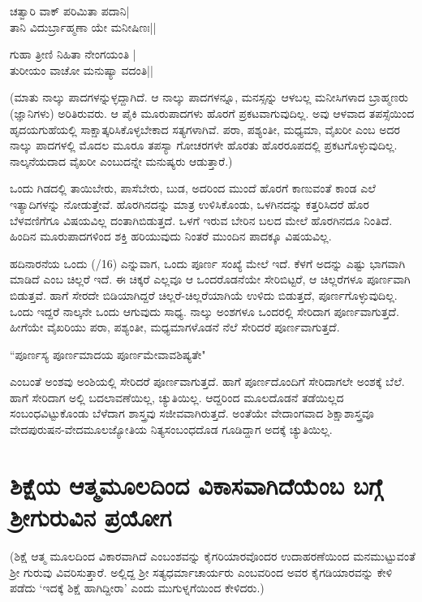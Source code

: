 \begin{shloka}
ಚತ್ವಾರಿ ವಾಕ್ ಪರಿಮಿತಾ ಪದಾನಿ|\label{22}\\
ತಾನಿ ವಿದುರ್ಬ್ರಾಹ್ಮಣಾ ಯೇ ಮನೀಷಿಣಃ||
\end{shloka}

\begin{shloka}
ಗುಹಾ ತ್ರೀಣಿ ನಿಹಿತಾ ನೇಂಗಯಂತಿ |\\
ತುರೀಯಂ ವಾಚೋ ಮನುಷ್ಯಾ ವದಂತಿ||
\end{shloka}

(ಮಾತು ನಾಲ್ಕು ಪಾದಗಳನ್ನುಳ್ಳದ್ದಾಗಿದೆ. ಆ ನಾಲ್ಕು  ಪಾದಗಳನ್ನೂ, ಮನಸ್ಸನ್ನು ಆಳಬಲ್ಲ ಮನೀಸಿಗಳಾದ ಬ್ರಾಹ್ಮಣರು (ಜ್ಞಾನಿಗಳು) ಅರಿತಿರುವರು. ಆ ಪೈಕಿ ಮೂರುಪಾದಗಳು ಹೊರಗೆ ಪ್ರಕಟವಾಗುವುದಿಲ್ಲ. ಅವು ಆಳವಾದ ತಪಸ್ಸೆಯಿಂದ ಹೃದಯಗುಹೆಯಲ್ಲಿ ಸಾಕ್ಷಾತ್ಕರಿಸಿಕೊಳ್ಳಬೇಕಾದ ಸತ್ಯಗಳಾಗಿವೆ. ಪರಾ, ಪಶ್ಯಂತೀ, ಮಧ್ಯಮಾ, ವೈಖರೀ ಎಂಬ ಅದರ ನಾಲ್ಕು  ಪಾದಗಳಲ್ಲಿ ಮೊದಲ ಮೂರೂ ತಪಸ್ಯಾ ಗೋಚರಗಳೇ ಹೊರತು ಹೊರರೂಪದಲ್ಲಿ ಪ್ರಕಟಗೊಳ್ಳುವುದಿಲ್ಲ. ನಾಲ್ಕನೆಯದಾದ ವೈಖರೀ ಎಂಬುದನ್ನೇ ಮನುಷ್ಯರು ಆಡುತ್ತಾರೆ.)

ಒಂದು ಗಿಡದಲ್ಲಿ ತಾಯಿಬೇರು, ಪಾಸೆಬೇರು, ಬುಡ, ಅದರಿಂದ ಮುಂದೆ ಹೊರಗೆ ಕಾಣುವಂತೆ ಕಾಂಡ ಎಲೆ ಇತ್ಯಾದಿಗಳನ್ನು ನೋಡುತ್ತೇವೆ. ಹೊರಗಿನದನ್ನು ಮಾತ್ರ ಉಳಿಸಿಕೊಂಡು, ಒಳಗಿನದನ್ನು ಕತ್ತರಿಸಿದರೆ ಹೊರ ಬೆಳವಣಿಗೆಗೂ ವಿಷಯವಿಲ್ಲ ದಂತಾಗಿಬಿಡುತ್ತದೆ. ಒಳಗೆ ಇರುವ ಬೇರಿನ ಬಲದ ಮೇಲೆ ಹೊರಗಿನದೂ ನಿಂತಿದೆ. ಹಿಂದಿನ ಮೂರುಪಾದಗಳಿಂದ ಶಕ್ತಿ ಹರಿಯುವುದು ನಿಂತರೆ ಮುಂದಿನ ಪಾದಕ್ಕೂ  ವಿಷಯವಿಲ್ಲ.

ಹದಿನಾರನೆಯ ಒಂದು {(/16)} ಎನ್ನುವಾಗ, ಒಂದು ಪೂರ್ಣ ಸಂಖ್ಯೆ ಮೇಲೆ ಇದೆ. ಕೆಳಗೆ ಅದನ್ನು ಎಷ್ಟು ಭಾಗವಾಗಿ ಮಾಡಿದೆ ಎಂಬ ಚಿಲ್ಲರೆ ಇದೆ. ಈ ಚಿಕ್ಕರೆ ಎಲ್ಲವೂ ಆ ಒಂದರೊಡನೆಯೇ ಸೇರಿಬಿಟ್ಟರೆ, ಆ ಚಿಲ್ಲರೆಗಳೂ ಪೂರ್ಣವಾಗಿ ಬಿಡುತ್ತವೆ. ಹಾಗೆ ಸೇರದೇ ಬಿಡಿಯಾಗಿದ್ದರೆ ಚಿಲ್ಲರೆ-ಚಿಲ್ಲರೆಯಾಗಿಯೆ ಉಳಿದು ಬಿಡುತ್ತದೆ, ಪೂರ್ಣಗೊಳ್ಳುವುದಿಲ್ಲ. ಒಂದು ಇದ್ದರೆ ನಾಲ್ಕನೇ ಒಂದು ಆಗುವುದು ಸಾಧ್ಯ. ನಾಲ್ಕು ಅಂಶಗಳೂ ಒಂದರಲ್ಲಿ ಸೇರಿದಾಗ ಪೂರ್ಣವಾಗುತ್ತದೆ. ಹೀಗೆಯೇ ವೈಖರಿಯು ಪರಾ, ಪಶ್ಯಂತೀ, ಮಧ್ಯಮಾಗಳೊಡನೆ ನೆಲೆ ಸೇರಿದರೆ ಪೂರ್ಣವಾಗುತ್ತದೆ.
\begin{shloka}
``ಪೂರ್ಣಸ್ಯ ಪೂರ್ಣಮಾದಯ ಪೂರ್ಣಮೇವಾವಶಿಷ್ಯತೇ"\label{23}
\end{shloka}

ಎಂಬಂತೆ ಅಂಶವು ಅಂಶಿಯಲ್ಲಿ ಸೇರಿದರೆ ಪೂರ್ಣವಾಗುತ್ತದೆ. ಹಾಗೆ ಪೂರ್ಣದೊಂದಿಗೆ ಸೇರಿದಾಗಲೇ ಅಂಶಕ್ಕೆ ಬೆಲೆ. ಹಾಗೆ ಸೇರಿದಾಗ ಅಲ್ಲಿ ಬದಲಾವಣೆಯಿಲ್ಲ, ಚ್ಯುತಿಯಿಲ್ಲ. ಆದ್ದರಿಂದ  ಮೂಲದೊಡನೆ ತಡೆಯಿಲ್ಲದ ಸಂಬಂಧವಿಟ್ಟುಕೊಂಡು ಬೆಳೆದಾಗ ಶಾಸ್ತ್ರವು ಸಜೀವವಾಗಿರುತ್ತದೆ. ಅಂತೆಯೇ ವೇದಾಂಗವಾದ ಶಿಕ್ಷಾಶಾಸ್ತ್ರವೂ ವೇದಪುರುಷನ-ವೇದಮೂಲಜ್ಯೋತಿಯ ನಿತ್ಯಸಂಬಂಧದೊಡ ಗೂಡಿದ್ದಾಗ  ಅದಕ್ಕೆ  ಚ್ಯುತಿಯಿಲ್ಲ.

\section*{ಶಿಕ್ಷೆಯ ಆತ್ಮಮೂಲದಿಂದ ವಿಕಾಸವಾಗಿದೆಯೆಂಬ ಬಗ್ಗೆ ಶ್ರೀಗುರುವಿನ ಪ್ರಯೋಗ}

(ಶಿಕ್ಷೆ ಆತ್ಮ ಮೂಲದಿಂದ ವಿಕಾರವಾಗಿದೆ ಎಂಬಂಶವನ್ನು ಕೈಗರಿಯಾರವೊಂದರ ಉದಾಹರಣೆಯಿಂದ ಮನಮುಟ್ಟುವಂತೆ ಶ್ರೀ ಗುರುವು ವಿವರಿಸುತ್ತಾರೆ. ಅಲ್ಲಿದ್ದ ಶ್ರೀ ಸತ್ಯಧರ್ಮಾಚಾರ್ಯರು  ಎಂಬವರಿಂದ ಅವರ ಕೈಗಡಿಯಾರವನ್ನು ಕೇಳಿ ಪಡೆದು `ಇದಕ್ಕೆ ಶಿಕ್ಷೆ ಹಾಗಿದ್ದೀರಾ' ಎಂದು ಮುಗುಳ್ನಗೆಯಿಂದ ಕೇಳಿದರು.)


